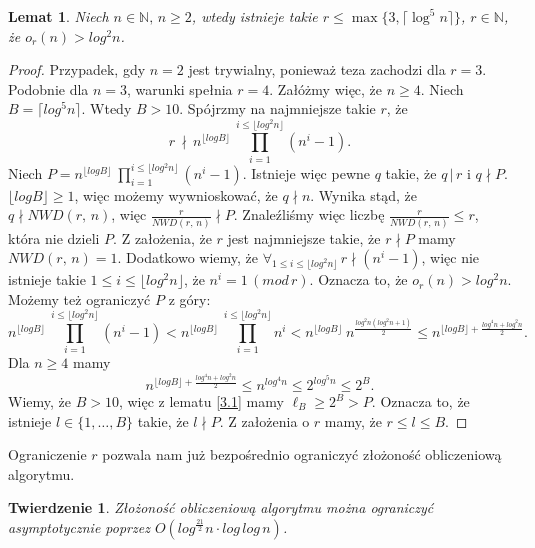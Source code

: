 \documentclass[polish,declaration,shortabstract]{iithesis}
\theoremstyle{definition}
\theoremstyle{remark} \newtheorem{observation}{Obserwacja}
\theoremstyle{plain} \newtheorem{theorem}{Twierdzenie}
\theoremstyle{plain} \newtheorem{lemma}{Lemat}
\theoremstyle{remark} \newtheorem*{remark*}{Uwaga}
\theoremstyle{reminder} \newtheorem*{reminder*}{Przypomnienie}
\begin{document}
\begin{lemma}\label{r_szacowanie}
	Niech $n \in \mathbb{N}, \, n \geq 2$, wtedy istnieje takie $r \leq \max \{3, \lceil\log^5n\rceil \}$, $r \in \mathbb{N}$, że $o_r(n) > log^2n$.
\end{lemma}
	
\begin{proof}
	Przypadek, gdy $n=2$ jest trywialny, ponieważ teza zachodzi dla $r=3$. Podobnie dla $n=3$, warunki spełnia $r=4$.\newline
	Załóżmy więc, że $n \geq 4$. Niech $B = \lceil log^5n \rceil$. Wtedy $B > 10$. \newline
	Spójrzmy na najmniejsze takie $r$, że \[ r \, \nmid \, n^{\lfloor log B \rfloor} \: \prod_{i=1}^{i \leq \lfloor log^2 n \rfloor}(n^i - 1).\]
	Niech $P = n^{\lfloor log B \rfloor} \: \prod_{i=1}^{i \leq \lfloor log^2 n \rfloor}(n^i - 1)$. 
	Istnieje więc pewne $q$ takie, że $q \, | \, r$ i $q \nmid P$. $\lfloor log B \rfloor \geq 1$, więc możemy wywnioskować, że $q \nmid n$. Wynika stąd, że $q \nmid NWD(r,\, n)$, więc $\frac{r}{NWD(r, \, n)} \nmid P$. Znaleźliśmy więc liczbę $\frac{r}{NWD(r, \, n)} \leq r$, która nie dzieli $P$. Z założenia, że $r$ jest najmniejsze takie, że $r \nmid P$ mamy $NWD(r, \, n) = 1$.\newline
	Dodatkowo wiemy, że $\forall_{1 \leq i \leq \lfloor log^2 n \rfloor} \, r \nmid (n^i - 1)$, więc nie istnieje takie $1 \leq i \leq \lfloor log^2 n \rfloor$, że $n^i = 1 \, (mod \, r)$. Oznacza to, że $o_r(n) > log^2n$.
	Możemy też ograniczyć $P$ z góry:
	\[n^{\lfloor log B \rfloor} \: \prod_{i=1}^{i \leq \lfloor log^2 n \rfloor}(n^i - 1) < n^{\lfloor log B \rfloor} \: \prod_{i=1}^{i \leq \lfloor log^2 n \rfloor}n^i <  n^{\lfloor log B \rfloor} \: n^{\frac{log^2n(log^2n + 1)}{2}} \leq n^{{\lfloor log B \rfloor} + \frac{log^4n + log^2n}{2}}.\]
	Dla $n \geq 4$ mamy\[n^{{\lfloor log B \rfloor} + \frac{log^4n + log^2n}{2}} \leq n^{log^4n} \leq 2^{log^5n} \leq 2^B.\]
	Wiemy, że $B > 10$, więc z lematu \ref{3.1} mamy $\ell_B \geq 2^B > P$. Oznacza to, że istnieje $l \in \{1, \dots, B\}$ takie, że $l \nmid P$. Z założenia o $r$ mamy, że $r \leq l \leq B$.
\end{proof}

Ograniczenie $r$ pozwala nam już bezpośrednio ograniczyć złożoność obliczeniową algorytmu.

\begin{theorem}
	Złożoność obliczeniową algorytmu można ograniczyć asymptotycznie poprzez $O(log^{\frac{21}{2}}n \cdot log \, log \, n)$.
\end{theorem}
	
\end{document}
